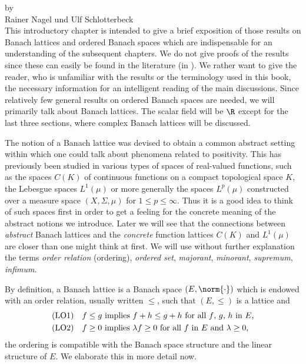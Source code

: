 \setcounter{section}{0}
\label{chap:c1}%
\thispagestyle{empty}
{\Large
\vspace*{-.75cm}
by \\[.25em]
Rainer Nagel und Ulf Schlotterbeck
\vspace{.75cm}
\\
}
This introductory chapter is intended to give a brief exposition of those results on Banach lattices and ordered Banach spaces which are indispensable for an understanding of the subsequent chapters.
We do not give proofs of the results since these can easily be found in the literature (\eg in \textcite{schaefer:1974}).
We rather want to give the reader, who is unfamiliar with the results or the terminology used in this book, the necessary information for an intelligent reading of the main discussions.
Since relatively few general results on ordered Banach spaces are needed, we will primarily talk about Banach lattices.
The scalar field will be $\R$ except for the last three sections, where complex Banach lattices will be discussed.

The notion of a Banach lattice was devised to obtain a common abstract setting within which one could talk about phenomena related to positivity.
This has previously been studied in various types of spaces of real-valued functions, such as the spaces $ C(K) $ of continuous functions on a compact topological space $ K $, the Lebesgue spaces $ L^{1}(\mu) $ or more generally the spaces $ L^{p}(\mu) $ constructed over a measure space $ (X,\Sigma,\mu) $ for $ 1 \leq p \leq \infty $.
Thus it is a good idea to think of such spaces first in order to get a feeling for the concrete meaning of the abstract notions we introduce.
Later we will see that the connections between \emph{abstract} Banach lattices and the \emph{concrete} function lattices $ C(K) $ and $ L^{1}(\mu) $ are closer than one might think at first.
We will use without further explanation the terms \emph{order relation} (ordering), \emph{ordered set}, \emph{majorant}, \emph{minorant}, \emph{supremum}, \emph{infimum}.

By definition, a Banach lattice is a Banach space $ (E,\norm{\cdot}) $ which is endowed with an order relation, usually written $ \leq $, such that $ (E,\leq) $ is a lattice and 
\begin{align*}
 &\mathrm{(LO1)} \quad \text{$f \leq g$ implies $f + h \leq g + h $
 	 for all $ f $, $ g $, $ h $ in  $ E $,}  \\
 &\mathrm{(LO2)} \quad \text{$f \geq 0$  implies   $\lambda f \geq 0$ for all $ f $ in $ E $ 
 	and  $\lambda \geq 0$,}
\end{align*}
\ie the ordering is compatible with the Banach space structure and the linear structure of\/ $ E $.
We elaborate this in more detail now.



